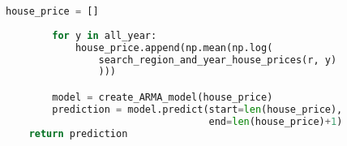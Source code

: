 \documentclass[12pt]{article}  %
\begin{document}
\begin{subappendices}
\begin{lstlisting}[language=Python, name={predict_house_price_mean}]
        house_price = [] 
        
        for y in all_year:
            house_price.append(np.mean(np.log(
                search_region_and_year_house_prices(r, y)
                )))

        model = create_ARMA_model(house_price)
        prediction = model.predict(start=len(house_price), 
                                   end=len(house_price)+1)
    return prediction
\end{lstlisting}



\end{subappendices}  %
\end{document}
